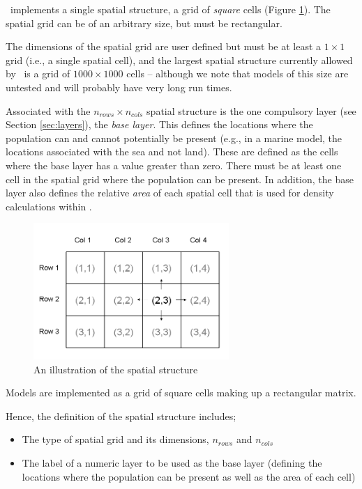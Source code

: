 \IBM\ implements a single spatial structure, a grid of \emph{square} cells (Figure \ref{fig:SquareSpatialStructure}). The spatial grid can be of an arbitrary size, but must be rectangular. 

The dimensions of the spatial grid are user defined but must be at least a $1 \times 1$ grid (i.e., a single spatial cell), and the largest spatial structure currently allowed by \IBM\ is a grid of $1000 \times 1000$ cells -- although we note that models of this size are untested and will probably have very long run times. 

Associated with the $n_{rows} \times n_{cols}$ spatial structure is the one compulsory layer (see Section \ref{sec:layers}), the \emph{base layer}. This defines the locations where the population can and cannot potentially be present (e.g., in a marine model, the locations associated with the sea and not land). These are defined as the cells where the base layer has a value greater than zero. There must be at least one cell in the spatial grid where the population can be present. In addition, the base layer also defines the relative \emph{area} of each spatial cell that is used for density calculations within \IBM.

\begin{figure}[htp]
	\centering
	\includegraphics[width=0.66\textwidth]{Figures/SquareStructure}
	\caption{An illustration of the spatial structure}
	\label{fig:SquareSpatialStructure}
\end{figure}

Models are implemented as a grid of square cells making up a rectangular matrix.

Hence, the definition of the spatial structure includes;
\begin{itemize}
	\item The type of spatial grid and its dimensions, $n_{rows}$ and $n_{cols}$
	\item The label of a numeric layer to be used as the base layer (defining the locations where the population can be present as well as the area of each cell)
\end{itemize}

